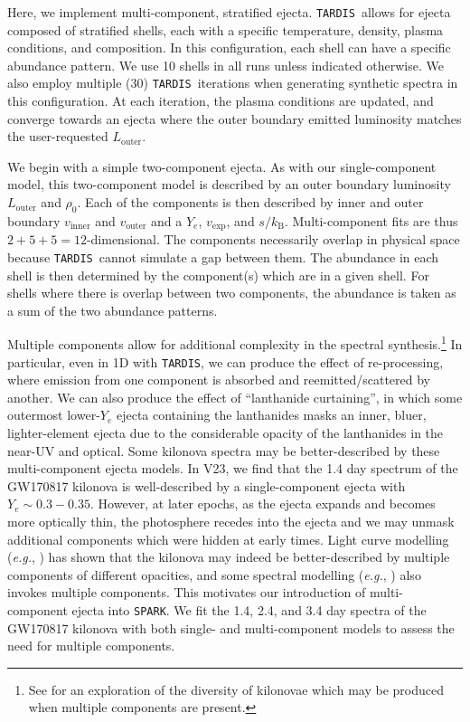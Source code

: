 \documentclass[twocolumn, twocolappendix]{aastex63}
\def\SPARK{\texttt{SPARK}}
\def\TARDIS{\texttt{TARDIS}}
\def\eg{{\it e.g.}}
\begin{document}
Here, we implement multi-component, stratified ejecta. \TARDIS~allows for ejecta composed of stratified shells, each with a specific temperature, density, plasma conditions, and composition. In this configuration, each shell can have a specific abundance pattern. We use 10 shells in all runs unless indicated otherwise. We also employ multiple (30) \TARDIS~iterations when generating synthetic spectra in this configuration. At each iteration, the plasma conditions are updated, and converge towards an ejecta where the outer boundary emitted luminosity matches the user-requested $L_{\mathrm{outer}}$. 
    
We begin with a simple two-component ejecta. As with our single-component model, this two-component model is described by an outer boundary luminosity $L_{\mathrm{outer}}$ and $\rho_0$. Each of the components is then described by inner and outer boundary $v_{\mathrm{inner}}$ and $v_{\mathrm{outer}}$ and a $Y_e$, $v_{\mathrm{exp}}$, and $s / k_{\mathrm{B}}$. Multi-component fits are thus $2 + 5 + 5 = 12$-dimensional. The components necessarily overlap in physical space because \TARDIS~cannot simulate a gap between them. The abundance in each shell is then determined by the component(s) which are in a given shell. For shells where there is overlap between two components, the abundance is taken as a sum of the two abundance patterns. %
    
Multiple components allow for additional complexity in the spectral synthesis.\footnote{See \cite{kawaguchi20} for an exploration of the diversity of kilonovae which may be produced when multiple components are present.} In particular, even in 1D with \TARDIS, we can produce the effect of re-processing, where emission from one component is absorbed and reemitted/scattered by another. We can also produce the effect of ``lanthanide curtaining'', in which some outermost lower-$Y_e$ ejecta containing the lanthanides masks an inner, bluer, lighter-element ejecta due to the considerable opacity of the lanthanides in the near-UV and optical. Some kilonova spectra may be better-described by these multi-component ejecta models. In V23, we find that the 1.4 day spectrum of the GW170817 kilonova is well-described by a single-component ejecta with $Y_e \sim 0.3-0.35$. However, at later epochs, as the ejecta expands and becomes more optically thin, the photosphere recedes into the ejecta and we may unmask additional components which were hidden at early times. Light curve modelling (\eg, \citealt{villar17}) has shown that the kilonova may indeed be better-described by multiple components of different opacities, and some spectral modelling (\eg, \citealt{kasen17}) also invokes multiple components. This motivates our introduction of multi-component ejecta into \SPARK. We fit the 1.4, 2.4, and 3.4 day spectra of the GW170817 kilonova with both single- and multi-component models to assess the need for multiple components.
\end{document}
